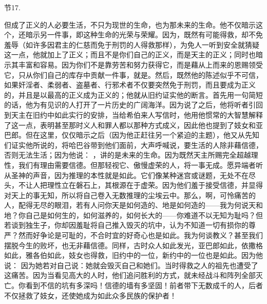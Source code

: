 节17.  \par

但成了正义的人必要生活，不只为现世的生命，也为那未来的生命。他不仅暗示这个，还暗示另一件事，即这种生命的光荣与荣耀。因为，既然有可能得救，却不免羞辱（如许多因君主的仁慈而免于刑罚的人得救那样），为免人一听到安全就猜疑这一点，他就加上了正义；而且不是你们自己的正义，而是天主的正义；同时也暗示其丰富和容易。因为你们不是靠劳苦和努力获得它，而是藉从上而来的恩赐领受它，只从你们自己的库存中贡献一件事，就是。然后，既然他的陈述似乎不可信，如果奸淫者、柔弱者、盗墓者、行邪术者不仅要突然免于刑罚，而且要成为正义的，并且是以最高的正义成为正义的；他就从旧约证实他的断言。首先用一句简短的话，他为有见识的人打开了一片历史的广阔海洋。因为说了之后，他将听者引回到天主在旧约中如此实行的安排，当给希伯来人写信时，他用他惯常的大智慧解释了这一点，表明甚至那时义人和罪人都以那种方式成义，因此他也提到了妓女和亚巴郎。但在这里，仅仅暗示之后（因为他正赶往另一个紧迫的主题），他又从先知们证实他所说的，将哈巴谷带到他们面前，大声呼喊说，要生活的人除非藉信德，否则无法生活；因为他说： ，讲的是未来的生命。因为既然天主所赐完全超越理性，我们有理由需要信德。但那轻视它、傲慢虚荣的人，将一事无成。愿异端者听从圣神的声音，因为推理的本性就是如此。它们像某种迷宫或谜题，无处不在尽头，不让人把理性立在磐石上，其根源在于虚荣。因为他们羞于接受信德，并显得对天上的事无知，所以将自己卷入无数推理的尘埃云中。那么，啊，可怜痛苦的人，配得无尽的眼泪，若有人问你天是如何造的、地是如何造的——我为何说天和地？你自己是如何生的，如何滋养的，如何长大的——你难道不以无知为耻吗？但若谈到独生子，你却因羞耻将自己推入毁灭的坑中，认为不知道一切有损你的尊严？然而好争论是可耻的，不合时宜的好奇心也是如此。我为何谈教义？甚至我们摆脱今生的败坏，也无非藉信德。同样，古时众人如此发光，亚巴郎如此，依撒格如此，雅各伯如此，妓女也得救，旧约中的一位，新约中的一位也是如此。因为他说：  因为她若对自己说：她就会毁灭自己和她们。当时得救之人的祖先也遭受了这痛苦。因为当看见高大的人时，他们追问胜利的方式，就未经战斗和阵列全部灭亡。你看到不信的坑有多深吗！信德的墙有多坚固！前者带下无数成千的人，后者不仅拯救了妓女，还使她成为如此众多民族的保护者！\par

